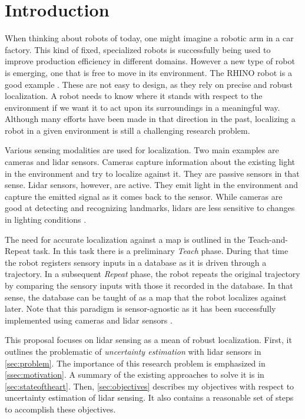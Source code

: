 \documentclass[10pt,letterpaper,oneside]{article}
\begin{document}
\makeCustomTitle
\thispagestyle{titlePage}

\section{Introduction}

When thinking about robots of today, one might imagine a robotic arm in a car factory.
This kind of fixed, specialized robots is successfully being used to improve production efficiency in different domains.
However a new type of robot is emerging, one that is free to move in its environment.
The RHINO robot is a good example \cite{Burgard1998}.
These are not easy to design, as they rely on precise and robust localization.
A robot needs to know where it stands with respect to the environment if we want it to act upon its surroundings in a meaningful way.
Although many efforts have been made in that direction in the past, localizing a robot in a given environment is still a challenging research problem.

Various sensing modalities are used for localization.
Two main examples are cameras and lidar sensors.
Cameras capture information about the existing light in the environment and try to localize against it.
They are passive sensors in that sense.
Lidar sensors, however, are active.
They emit light in the environment and capture the emitted signal as it comes back to the sensor.
While cameras are good at detecting and recognizing landmarks, lidars are less sensitive to changes in lighting conditions \cite{McManus2012}.

The need for accurate localization against a map is outlined in the Teach-and-Repeat task.
In this task there is a preliminary \emph{Teach} phase.
During that time the robot registers sensory inputs in a database as it is driven through a trajectory.
In a subsequent \emph{Repeat} phase, the robot repeats the original trajectory by comparing the sensory inputs with those it recorded in the database.
In that sense, the database can be taught of as a map that the robot localizes against later.
Note that this paradigm is sensor-agnostic as it has been successfully implemented using cameras \cite{Furgale2010} and lidar sensors \cite{Sprunk2013}. 

This proposal focuses on lidar sensing as a mean of robust localization.
First, it outlines the problematic of \emph{uncertainty estimation} with lidar sensors in \autoref{sec:problem}.
The importance of this research problem is emphasized in \autoref{ssec:motivation}.
A summary of the existing approaches to solve it is in \autoref{sec:stateoftheart}.
Then, \autoref{sec:objectives} describes my objectives with respect to uncertainty estimation of lidar sensing.
It also contains a reasonable set of steps to accomplish these objectives.
\end{document}
